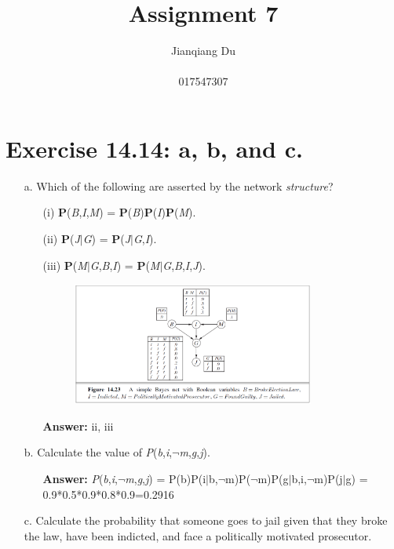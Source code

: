 \documentclass{article}
\begin{document}
\title{\Large Assignment 7}
\author{Jianqiang Du\\\\017547307}
\maketitle

\section{Exercise 14.14: a, b, and c.}
\begin{itemize}
\item[a.]Which of the following are asserted by the network \textit{structure}?
	\begin{itemize}
	\item[(i)]\textbf P(\textit B,\textit I,\textit M) = \textbf P(\textit B)\textbf P(\textit I)\textbf P(\textit M).
	\item[(ii)]\textbf P(\textit J$\vert$\textit G) = \textbf P(\textit J$\vert$\textit G,\textit I).
	\item[(iii)]\textbf P(\textit M$\vert$\textit G,\textit B,\textit I) = \textbf P(\textit M$\vert$\textit G,\textit B,\textit I,\textit J).
	\begin{figure}[h!]
	\centering
	\includegraphics[width=0.8\textwidth]{figure_14_23.png}
	\end{figure}
	\item[\textbf{Answer:}]ii, iii
	\end{itemize}
\item[b.]Calculate the value of \textit P(\textit b,\textit i,$\neg$\textit m,\textit g,\textit j).
	\begin{itemize}
	\item[\textbf{Answer:}]\textit P(\textit b,\textit i,$\neg$\textit m,\textit g,\textit j) = P(b)P(i$\vert$b,$\neg$m)P($\neg$m)P(g$\vert$b,i,$\neg$m)P(j$\vert$g) = 0.9*0.5*0.9*0.8*0.9=0.2916
	\end{itemize}
\item[c.]Calculate the probability that someone goes to jail given that they broke the law, have been indicted, and face a politically motivated prosecutor.

\end{itemize}
\end{document}
